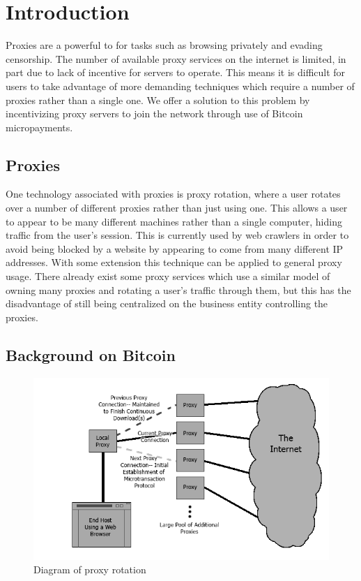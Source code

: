 \section{Introduction}
\label{sec:intro}


Proxies are a powerful to for tasks such as browsing privately and evading censorship. The number of available proxy services on the internet is limited, in part due to lack of incentive for servers to operate. This means it is difficult for users to take advantage of more demanding techniques which require a number of proxies rather than a single one. We offer a solution to this problem by incentivizing proxy servers to join the network through use of Bitcoin micropayments. 

\subsection{Proxies}

One technology associated with proxies is proxy rotation, where a user rotates over a number of different proxies rather than just using one. This allows a user to appear to be many different machines rather than a single computer, hiding traffic from the user's session. This is currently used by web crawlers in order to avoid being blocked by a website by appearing to come from many different IP addresses. With some extension this technique can be applied to general proxy usage. There already exist some proxy services which use a similar model of owning many proxies and rotating a user's traffic through them, but this has the disadvantage of still being centralized on the business entity controlling the proxies.

\subsection{Background on Bitcoin}
\begin{figure}
  \centering
  \includegraphics[width=1.05\textwidth]{proxydiagram.png}
  \caption{Diagram of proxy rotation}
  \label{fig:proxy-diagram}
\end{figure}

